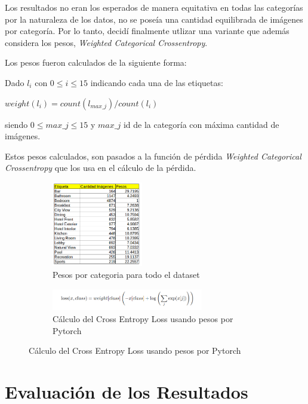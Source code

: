 \documentclass{article}[9pt]
\begin{document}
Los resultados no eran los esperados de manera equitativa en todas las categorías por la naturaleza de los datos, no se poseía una cantidad equilibrada de imágenes por categoría. Por lo tanto, decidí finalmente utlizar una variante que además considera los pesos, \textit{Weighted Categorical Crossentropy}.

Los pesos fueron calculados de la siguiente forma:

Dado $l_{i}$ con $0 \leq i \leq 15$ indicando cada una de las etiquetas:
\begin{center}
$ weight(l_{i}) = count(l_{max\_j}) / count(l_{i})$
\end{center}
siendo $0 \leq max\_j \leq 15$ y $max\_j$ id de la categoría con máxima cantidad de imágenes.

Estos pesos calculados, son pasados a la función de pérdida  \textit{Weighted Categorical Crossentropy} que los usa en el cálculo de la pérdida.

\begin{figure}[H]
  \begin{subfigure}{.5\textwidth}
  \begin{center}
    \includegraphics[width=150px]{img/weights.png}
    \caption{Pesos por categoria para todo el dataset }
  \end{center}
    \end{subfigure}
      \begin{subfigure}{.5\textwidth}
  \begin{center}
    \includegraphics[width=250px]{img/CrossEntropyLoss.png}
    \caption{ Cálculo del Cross Entropy Loss usando pesos por Pytorch }
  \end{center}
        \end{subfigure}
\end{figure}

\section{Evaluación de los Resultados}
\label{sec:others}
\end{document}
